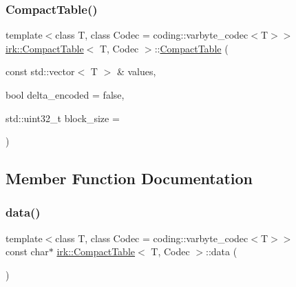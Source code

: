 \subsubsection{\texorpdfstring{Compact\+Table()}{CompactTable()}\hspace{0.1cm}{\footnotesize\ttfamily [2/2]}}
{\footnotesize\ttfamily template$<$class T, class Codec = coding\+::varbyte\+\_\+codec$<$\+T$>$$>$ \\
\mbox{\hyperlink{classirk_1_1CompactTable}{irk\+::\+Compact\+Table}}$<$ T, Codec $>$\+::\mbox{\hyperlink{classirk_1_1CompactTable}{Compact\+Table}} (\begin{DoxyParamCaption}\item[{const std\+::vector$<$ T $>$ \&}]{values,  }\item[{bool}]{delta\+\_\+encoded = {\ttfamily false},  }\item[{std\+::uint32\+\_\+t}]{block\+\_\+size = {} }\end{DoxyParamCaption})\hspace{0.3cm}{\ttfamily [inline]}}



\subsection{Member Function Documentation}
\mbox{\label{classirk_1_1CompactTable_a03d76b3db79f79d4c218e1eeeb9cad42}} 
\subsubsection{\texorpdfstring{data()}{data()}}
{\footnotesize\ttfamily template$<$class T, class Codec = coding\+::varbyte\+\_\+codec$<$\+T$>$$>$ \\
const char$\ast$ \mbox{\hyperlink{classirk_1_1CompactTable}{irk\+::\+Compact\+Table}}$<$ T, Codec $>$\+::data (\begin{DoxyParamCaption}{ }\end{DoxyParamCaption})\hspace{0.3cm}{\ttfamily [inline]}}

\mbox{\label{classirk_1_1CompactTable_aaf2fb5e1a0fd2e168dced03b4ebbf1a7}} 
